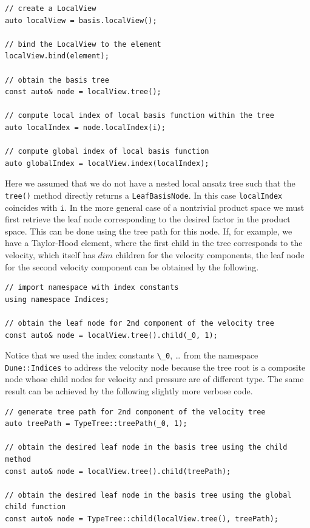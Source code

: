 \documentclass[a4paper,10pt,headings=normal,bibliography=totoc]{scrartcl}
\newcommand{\cpp}[1]{\lstinline[basicstyle=\ttfamily]!#1!}
\begin{document}
\begin{lstlisting}[style=Example]
// create a LocalView
auto localView = basis.localView();

// bind the LocalView to the element
localView.bind(element);

// obtain the basis tree
const auto& node = localView.tree();

// compute local index of local basis function within the tree
auto localIndex = node.localIndex(i);

// compute global index of local basis function
auto globalIndex = localView.index(localIndex);
\end{lstlisting}

Here we assumed that we do not have a nested local ansatz tree
such that the \cpp{tree()} method directly returns a \cpp{LeafBasisNode}.
In this case \cpp{localIndex} coincides with \cpp{i}.
In the more general case of a nontrivial product space
we must first retrieve the leaf node corresponding to
the desired factor in the product space. This can be done
using the tree path for this node. If, for example,
we have a Taylor-Hood element, where the first
child in the tree corresponds to the velocity,
which itself has $dim$ children for the velocity
components, the leaf node for the second velocity
component can be obtained by the following.

\begin{lstlisting}[style=Example]
// import namespace with index constants
using namespace Indices;

// obtain the leaf node for 2nd component of the velocity tree
const auto& node = localView.tree().child(_0, 1);
\end{lstlisting}

Notice that we used the index constants \cpp{\_0}, \dots{}
from the namespace \cpp{Dune::Indices}
to address the velocity node because the
tree root is a composite node whose child nodes
for velocity and pressure are of different type.
The same result can be achieved by the following
slightly more verbose code.

\begin{lstlisting}[style=Example]
// generate tree path for 2nd component of the velocity tree
auto treePath = TypeTree::treePath(_0, 1);

// obtain the desired leaf node in the basis tree using the child method
const auto& node = localView.tree().child(treePath);

// obtain the desired leaf node in the basis tree using the global child function
const auto& node = TypeTree::child(localView.tree(), treePath);
\end{lstlisting}
\end{document}
